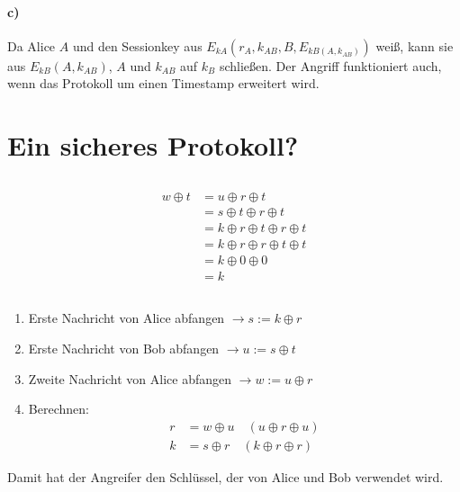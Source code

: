 \documentclass{../crypto}
\begin{document}
\paragraph{c)} Da Alice $A$ und den Sessionkey aus 
$E_{kA}(r_A,k_{AB},B,E_{kB(A,k_{AB})})$ weiß, kann sie aus $E_{kB}(A,k_{AB})$, 
$A$ und $k_{AB}$ auf $k_B$ schließen. Der Angriff funktioniert auch, wenn das 
Protokoll um einen Timestamp erweitert wird.

\section{Ein sicheres Protokoll?}

\subsection{}
\begin{align*}
	w \oplus t
	&= u \oplus r \oplus t\\
	&= s \oplus t \oplus r \oplus t\\
	&= k \oplus r \oplus t \oplus r \oplus t\\
	&= k \oplus r \oplus r \oplus t \oplus t\\
	&= k \oplus 0 \oplus 0\\
	&= k
\end{align*}

\subsection{}

\begin{enumerate}
   \item Erste Nachricht von Alice abfangen $\rightarrow s := k \oplus r$
     \item Erste Nachricht von Bob abfangen $\rightarrow u := s \oplus t$
     \item Zweite Nachricht von Alice abfangen $\rightarrow w := u \oplus r$
     \item Berechnen: 
        \begin{align*}
           r & = w \oplus u \quad \left(u \oplus r \oplus u\right)\\
           k & = s \oplus r \quad \left(k \oplus r \oplus r\right)
        \end{align*}
\end{enumerate}
Damit hat der Angreifer den Schlüssel, der von Alice und Bob verwendet wird.
\end{document}
